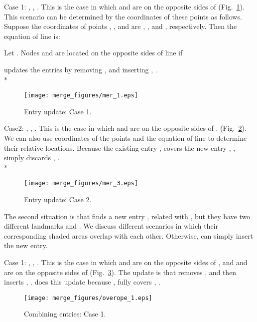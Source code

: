 \documentclass[3p,times]{elsarticle}
\begin{document}
Case 1:  ,     ,  . This is the case in which  and  are on the opposite sides of 
(Fig.~\ref{fig3_6}). This scenario can be determined by the coordinates of these points as follows. Suppose
the coordinates of points , ,  and   are , ,
 and , respectively. Then the equation of line   is:


Let .
Nodes  and  are located on the opposite sides of line 
if

 updates the entries by removing  ,   and inserting  ,  . \\*

\begin{figure}[!htp]
\begin{center}
\texttt{[image: merge\_figures/mer\_1.eps]}
\end{center}
\caption{Entry update: Case 1.}
\label{fig3_6}
\end{figure}





Case2:  ,       ,  . This is the case in which  and  are on the opposite sides of .
(Fig.~\ref{fig3_7}). We can also use coordinates of the points and the equation of line  to determine their relative locations.
Because the existing entry  ,  
covers the new entry  ,  ,  simply discards  ,   . \\*

\begin{figure}[!htp]
\begin{center}
\texttt{[image: merge\_figures/mer\_3.eps]}
\end{center}
\caption{Entry update: Case 2.}
\label{fig3_7}
\end{figure}




The second situation is that   finds a new entry
 ,   related with ,
but they have two different landmarks  and .
We discuss different scenarios in which their corresponding shaded areas overlap with each other.
Otherwise,  can simply insert the new entry.





Case 1:  ,     ,  .
This is the case in which  and  are on the opposite sides of ,
and  and  are on the opposite sides of  (Fig.~\ref{fig3_11}).
The update is that
  removes  ,   and then
   inserts  ,  .
 does this update because  ,   fully covers  ,  .


\begin{figure}[!htp]
\begin{center}
\texttt{[image: merge\_figures/overope\_1.eps]}
\end{center}
\caption{Combining entries: Case 1.}
\label{fig3_11}
\end{figure}
\end{document}

